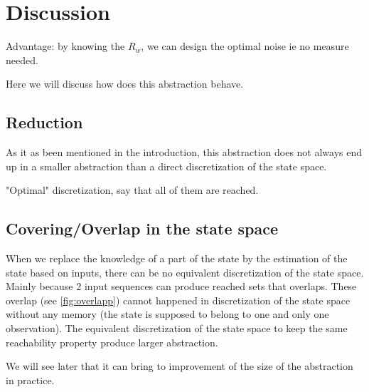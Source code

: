 \section{Discussion}
Advantage: by knowing the $R_w$, we can design the optimal noise ie no measure needed.

Here we will discuss how does this abstraction behave.

\subsection{Reduction}
As it as been mentioned in the introduction, this abstraction does not always end up in a smaller abstraction than a direct discretization of the state space.

"Optimal" discretization, say that all of them are reached.

\subsection{Covering/Overlap in the state space}
When we replace the knowledge of a part of the state by the estimation of the state based on inputs, there can be no equivalent discretization of the state space.
Mainly because 2 input sequences can produce reached sets that overlaps.
These overlap (see \ref{fig:overlapp}) cannot happened in discretization of the state space without any memory (the state is supposed to belong to one and only one observation).
The equivalent discretization of the state space to keep the same reachability property produce larger abstraction.

We will see later that it can bring to improvement of the size of the abstraction in practice.

